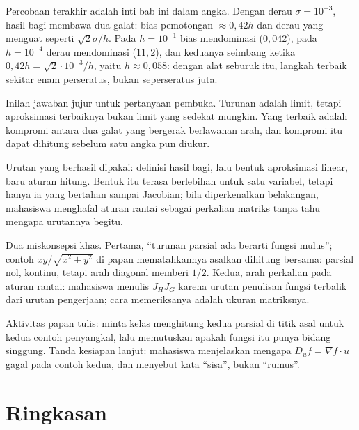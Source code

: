 Percobaan terakhir adalah inti bab ini dalam angka. Dengan derau
$\sigma=10^{-3}$, hasil bagi membawa dua galat: bias pemotongan $\approx0{,}42h$ dan derau
yang menguat seperti $\sqrt{2}\sigma/h$. Pada $h=10^{-1}$ bias mendominasi ($0{,}042$), pada
$h=10^{-4}$ derau mendominasi ($11{,}2$), dan keduanya seimbang ketika
$0{,}42h=\sqrt{2}\cdot10^{-3}/h$, yaitu $h\approx0{,}058$: dengan alat seburuk itu, langkah
terbaik sekitar enam perseratus, bukan seperseratus juta.

Inilah jawaban jujur untuk pertanyaan pembuka. Turunan adalah limit, tetapi aproksimasi
terbaiknya bukan limit yang sedekat mungkin. Yang terbaik adalah kompromi antara dua galat
yang bergerak berlawanan arah, dan kompromi itu dapat dihitung sebelum satu angka pun
diukur.

\begin{untukdosen}
Urutan yang berhasil dipakai: definisi hasil bagi, lalu bentuk aproksimasi linear, baru
aturan hitung. Bentuk itu terasa berlebihan untuk satu variabel, tetapi hanya ia yang bertahan
sampai Jacobian; bila diperkenalkan belakangan, mahasiswa menghafal aturan rantai sebagai
perkalian matriks tanpa tahu mengapa urutannya begitu.

Dua miskonsepsi khas. Pertama, ``turunan parsial ada berarti fungsi mulus''; contoh
$xy/\sqrt{x^{2}+y^{2}}$ di papan mematahkannya asalkan dihitung bersama: parsial nol,
kontinu, tetapi arah diagonal memberi $1/2$. Kedua, arah perkalian pada aturan rantai:
mahasiswa menulis $J_{H}J_{G}$ karena urutan penulisan fungsi terbalik dari urutan
pengerjaan; cara memeriksanya adalah ukuran matriksnya.

Aktivitas papan tulis: minta kelas menghitung kedua parsial di titik asal untuk kedua contoh
penyangkal, lalu memutuskan apakah fungsi itu punya bidang singgung. Tanda kesiapan lanjut:
mahasiswa menjelaskan mengapa $D_{u}f=\nabla f\cdot u$ gagal pada contoh kedua, dan menyebut
kata ``sisa'', bukan ``rumus''.
\end{untukdosen}

\section{Ringkasan}

